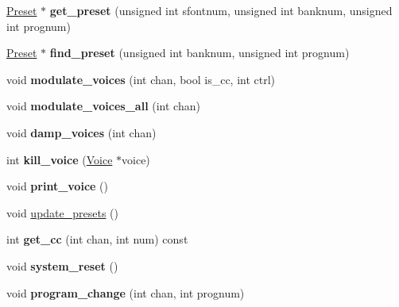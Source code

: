 \begin{DoxyCompactItemize}
\hyperlink{class_fluid_s_1_1_preset}{Preset} $\ast$ {\bfseries get\+\_\+preset} (unsigned int sfontnum, unsigned int banknum, unsigned int prognum)
\item 
\mbox{\label{class_fluid_s_1_1_fluid_ae1621636f932b8210595e504d0a84730}} 
\hyperlink{class_fluid_s_1_1_preset}{Preset} $\ast$ {\bfseries find\+\_\+preset} (unsigned int banknum, unsigned int prognum)
\item 
\mbox{\label{class_fluid_s_1_1_fluid_ae5c25f6f09b3c29081bb8ef46ebdc58d}} 
void {\bfseries modulate\+\_\+voices} (int chan, bool is\+\_\+cc, int ctrl)
\item 
\mbox{\label{class_fluid_s_1_1_fluid_a408c0f5925f4ff47adb231e8d6c7670a}} 
void {\bfseries modulate\+\_\+voices\+\_\+all} (int chan)
\item 
\mbox{\label{class_fluid_s_1_1_fluid_ac7e63754cd854419aeba2d52820681fd}} 
void {\bfseries damp\+\_\+voices} (int chan)
\item 
\mbox{\label{class_fluid_s_1_1_fluid_acea06512e17b5242f85aacfc75342faf}} 
int {\bfseries kill\+\_\+voice} (\hyperlink{class_fluid_s_1_1_voice}{Voice} $\ast$voice)
\item 
\mbox{\label{class_fluid_s_1_1_fluid_aa7d68b1dffed5b4e3a8edf646be09d9f}} 
void {\bfseries print\+\_\+voice} ()
\item 
void \hyperlink{class_fluid_s_1_1_fluid_abfefd9b9ccfb4a43148aeca8a5f052f1}{update\+\_\+presets} ()
\item 
\mbox{\label{class_fluid_s_1_1_fluid_a39c789e171574833a5218692b985a6d2}} 
int {\bfseries get\+\_\+cc} (int chan, int num) const
\item 
\mbox{\label{class_fluid_s_1_1_fluid_a7d73e8f588e2dc333e25b0b495ed2492}} 
void {\bfseries system\+\_\+reset} ()
\item 
\mbox{\label{class_fluid_s_1_1_fluid_a5152a3c75f8a4dd0c343af8e9129250e}} 
void {\bfseries program\+\_\+change} (int chan, int prognum)

\end{DoxyCompactItemize}
